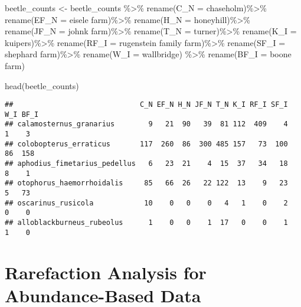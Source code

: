 \documentclass[
]{article}
\newenvironment{Shaded}{\begin{snugshade}}{\end{snugshade}}
\newcommand{\AttributeTok}[1]{\textcolor[rgb]{0.77,0.63,0.00}{#1}}
\newcommand{\FunctionTok}[1]{\textcolor[rgb]{0.00,0.00,0.00}{#1}}
\newcommand{\NormalTok}[1]{#1}
\newcommand{\OtherTok}[1]{\textcolor[rgb]{0.56,0.35,0.01}{#1}}
\newcommand{\SpecialCharTok}[1]{\textcolor[rgb]{0.00,0.00,0.00}{#1}}
\newcommand{\StringTok}[1]{\textcolor[rgb]{0.31,0.60,0.02}{#1}}
\begin{document}
\begin{Shaded}
\begin{Highlighting}[]
\NormalTok{beetle\_counts }\OtherTok{\textless{}{-}}\NormalTok{ beetle\_counts }\SpecialCharTok{\%\textgreater{}\%}
  \FunctionTok{rename}\NormalTok{(}\AttributeTok{C\_N =}\NormalTok{ chaseholm)}\SpecialCharTok{\%\textgreater{}\%}
  \FunctionTok{rename}\NormalTok{(}\AttributeTok{EF\_N =} \StringTok{\textasciigrave{}}\AttributeTok{eisele farm}\StringTok{\textasciigrave{}}\NormalTok{)}\SpecialCharTok{\%\textgreater{}\%}
  \FunctionTok{rename}\NormalTok{(}\AttributeTok{H\_N =}\NormalTok{ honeyhill)}\SpecialCharTok{\%\textgreater{}\%}
  \FunctionTok{rename}\NormalTok{(}\AttributeTok{JF\_N =} \StringTok{\textasciigrave{}}\AttributeTok{johnk farm}\StringTok{\textasciigrave{}}\NormalTok{)}\SpecialCharTok{\%\textgreater{}\%}
  \FunctionTok{rename}\NormalTok{(}\AttributeTok{T\_N =}\NormalTok{ turner)}\SpecialCharTok{\%\textgreater{}\%}
  \FunctionTok{rename}\NormalTok{(}\AttributeTok{K\_I =}\NormalTok{ kuipers)}\SpecialCharTok{\%\textgreater{}\%}
  \FunctionTok{rename}\NormalTok{(}\AttributeTok{RF\_I =} \StringTok{\textasciigrave{}}\AttributeTok{rugenstein family farm}\StringTok{\textasciigrave{}}\NormalTok{)}\SpecialCharTok{\%\textgreater{}\%}
  \FunctionTok{rename}\NormalTok{(}\AttributeTok{SF\_I =} \StringTok{\textasciigrave{}}\AttributeTok{shephard farm}\StringTok{\textasciigrave{}}\NormalTok{)}\SpecialCharTok{\%\textgreater{}\%}
  \FunctionTok{rename}\NormalTok{(}\AttributeTok{W\_I =}\NormalTok{ wallbridge) }\SpecialCharTok{\%\textgreater{}\%}
  \FunctionTok{rename}\NormalTok{(}\AttributeTok{BF\_I =} \StringTok{\textasciigrave{}}\AttributeTok{boone farm}\StringTok{\textasciigrave{}}\NormalTok{) }

\FunctionTok{head}\NormalTok{(beetle\_counts)}
\end{Highlighting}
\end{Shaded}

\begin{verbatim}
##                              C_N EF_N H_N JF_N T_N K_I RF_I SF_I W_I BF_I
## calamosternus_granarius        9   21  90   39  81 112  409    4   1    3
## colobopterus_erraticus       117  260  86  300 485 157   73  100  86  158
## aphodius_fimetarius_pedellus   6   23  21    4  15  37   34   18   8    1
## otophorus_haemorrhoidalis     85   66  26   22 122  13    9   23   5   73
## oscarinus_rusicola            10    0   0    0   4   1    0    2   0    0
## alloblackburneus_rubeolus      1    0   0    1  17   0    0    1   1    0
\end{verbatim}

\hypertarget{rarefaction-analysis-for-abundance-based-data}{%
\section{Rarefaction Analysis for Abundance-Based
Data}\label{rarefaction-analysis-for-abundance-based-data}}
\end{document}

